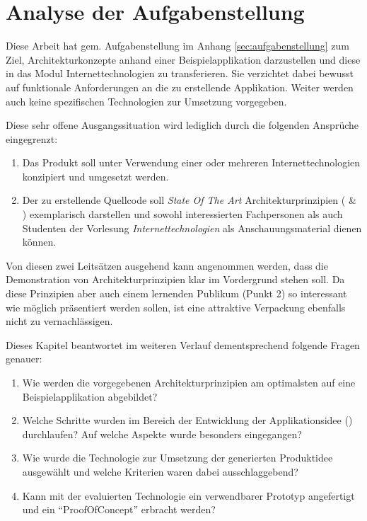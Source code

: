 \chapter{Analyse der Aufgabenstellung}
\label{sec:analyse-der-aufgabenstellung}

Diese Arbeit hat gem. Aufgabenstellung im Anhang \ref{sec:aufgabenstellung} zum Ziel, Architekturkonzepte anhand einer Beispielapplikation darzustellen und diese in das Modul Internettechnologien zu transferieren. Sie verzichtet dabei bewusst auf funktionale Anforderungen an die zu erstellende Applikation. Weiter werden auch keine spezifischen Technologien zur Umsetzung vorgegeben.

Diese sehr offene Ausgangssituation wird lediglich durch die folgenden Ansprüche eingegrenzt:

\begin{enumerate}
	\item Das Produkt soll unter Verwendung einer oder mehreren Internettechnologien konzipiert und umgesetzt werden.
	\item Der zu erstellende Quellcode soll \emph{State Of The Art} Architekturprinzipien (\cite{ROCA} \& \cite{TilkovSlides}) exemplarisch darstellen und sowohl interessierten Fachpersonen als auch Studenten der Vorlesung \emph{Internettechnologien} als Anschauungsmaterial dienen können.
\end{enumerate}

Von diesen zwei Leitsätzen ausgehend kann angenommen werden, dass die Demonstration von Architekturprinzipien klar im Vordergrund stehen soll. Da diese Prinzipien aber auch einem lernenden Publikum (Punkt 2) so interessant wie möglich präsentiert werden sollen, ist eine attraktive Verpackung ebenfalls nicht zu vernachlässigen.

Dieses Kapitel beantwortet im weiteren Verlauf dementsprechend folgende Fragen genauer:

\begin{enumerate}
	\item Wie werden die vorgegebenen Architekturprinzipien am optimalsten auf eine Beispielapplikation abgebildet?
	\item Welche Schritte wurden im Bereich der Entwicklung der Applikationsidee () durchlaufen? Auf welche Aspekte wurde besonders eingegangen?
	\item Wie wurde die Technologie zur Umsetzung der generierten Produktidee ausgewählt und welche Kriterien waren dabei ausschlaggebend?
	\item Kann mit der evaluierten Technologie ein verwendbarer Prototyp angefertigt und ein ``\gls{ProofOfConcept}'' erbracht werden?
\end{enumerate}

\newpage


\newpage


\newpage


\newpage

